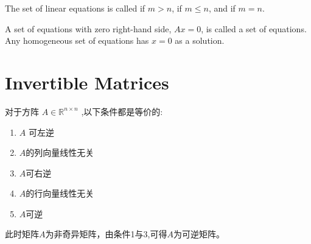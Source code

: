     The set
    of linear equations is called  if $ m>n $,   if $m \leq n$, and  if $m = n$.

    A set of equations with zero right-hand side, $ A x=0 $, is called a  set of equations. Any homogeneous set of equations has $ x=0 $ as a solution.

\section{Invertible Matrices}

\begin{theorem}
    对于方阵 $ A \in \mathbb{R}^{n \times n} $ ,以下条件都是等价的:

    \begin{enumerate}
        \item $ A $ 可左逆
        \item $A$的列向量线性无关
        \item $A$可右逆
        \item $A$的行向量线性无关
        \item $A$可逆
    \end{enumerate}

    此时矩阵$A$为非奇异矩阵，由条件1与3,可得$A$为可逆矩阵。 
\end{theorem}

